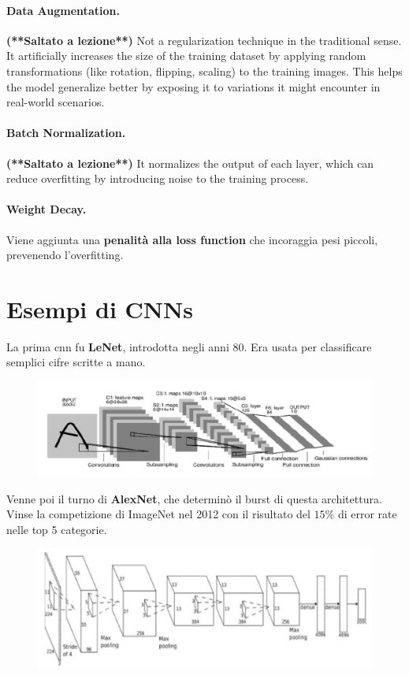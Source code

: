 \paragraph{Data Augmentation.} \textbf{(**Saltato a lezione**)} Not a regularization technique in the traditional sense. It artificially increases the size of the training dataset by applying random transformations (like rotation, flipping, scaling) to the training images.
This helps the model generalize better by exposing it to variations it might encounter in real-world scenarios.

\paragraph{Batch Normalization.} \textbf{(**Saltato a lezione**)} It normalizes the output of each layer, which can reduce overfitting by introducing noise to the training process.

\paragraph{Weight Decay.} Viene aggiunta una \textbf{penalità alla loss function} che incoraggia pesi piccoli, prevenendo l'overfitting.
\newpage
\section{Esempi di CNNs}
La prima cnn fu \textbf{LeNet}, introdotta negli anni 80. Era usata per classificare semplici cifre scritte a mano.
\begin{figure}[!h]
    \includegraphics[scale=.5]{images/cnn/lenet.png}
    \centering
\end{figure}



Venne poi il turno di \textbf{AlexNet}, che determinò il burst di questa architettura. Vinse la competizione di ImageNet nel 2012 con il risultato del $15\%$ di error rate nelle top 5 categorie.
\begin{figure}[!h]
    \includegraphics[scale=.5]{images/cnn/alexnet_ex.png}
    \centering
\end{figure}



